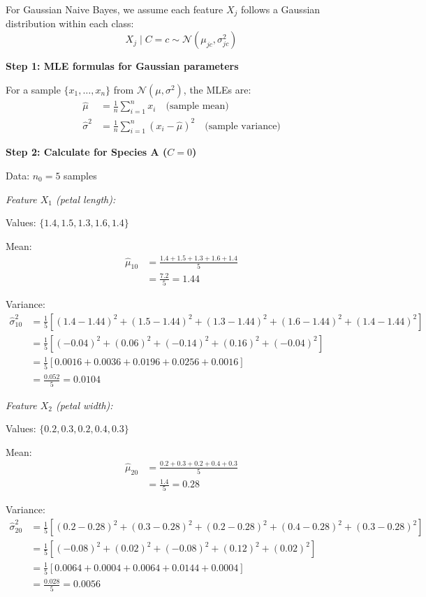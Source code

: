 \documentclass[12pt]{article}
\begin{document}
\begin{solution}
For Gaussian Naive Bayes, we assume each feature $X_j$ follows a Gaussian distribution within each class:
\[
X_j \mid C = c \sim \mathcal{N}(\mu_{jc}, \sigma_{jc}^2)
\]

\textbf{Step 1: MLE formulas for Gaussian parameters}

For a sample $\{x_1, \ldots, x_n\}$ from $\mathcal{N}(\mu, \sigma^2)$, the MLEs are:
\begin{align}
\hat{\mu} &= \frac{1}{n} \sum_{i=1}^{n} x_i \quad \text{(sample mean)} \\
\hat{\sigma}^2 &= \frac{1}{n} \sum_{i=1}^{n} (x_i - \hat{\mu})^2 \quad \text{(sample variance)}
\end{align}

\textbf{Step 2: Calculate for Species A ($C = 0$)}

Data: $n_0 = 5$ samples

\textit{Feature $X_1$ (petal length):}

Values: $\{1.4, 1.5, 1.3, 1.6, 1.4\}$

Mean:
\begin{align}
\hat{\mu}_{10} &= \frac{1.4 + 1.5 + 1.3 + 1.6 + 1.4}{5} \\
&= \frac{7.2}{5} = 1.44
\end{align}

Variance:
\begin{align}
\hat{\sigma}_{10}^2 &= \frac{1}{5}\left[(1.4-1.44)^2 + (1.5-1.44)^2 + (1.3-1.44)^2 + (1.6-1.44)^2 + (1.4-1.44)^2\right] \\
&= \frac{1}{5}\left[(-0.04)^2 + (0.06)^2 + (-0.14)^2 + (0.16)^2 + (-0.04)^2\right] \\
&= \frac{1}{5}\left[0.0016 + 0.0036 + 0.0196 + 0.0256 + 0.0016\right] \\
&= \frac{0.052}{5} = 0.0104
\end{align}

\textit{Feature $X_2$ (petal width):}

Values: $\{0.2, 0.3, 0.2, 0.4, 0.3\}$

Mean:
\begin{align}
\hat{\mu}_{20} &= \frac{0.2 + 0.3 + 0.2 + 0.4 + 0.3}{5} \\
&= \frac{1.4}{5} = 0.28
\end{align}

Variance:
\begin{align}
\hat{\sigma}_{20}^2 &= \frac{1}{5}\left[(0.2-0.28)^2 + (0.3-0.28)^2 + (0.2-0.28)^2 + (0.4-0.28)^2 + (0.3-0.28)^2\right] \\
&= \frac{1}{5}\left[(-0.08)^2 + (0.02)^2 + (-0.08)^2 + (0.12)^2 + (0.02)^2\right] \\
&= \frac{1}{5}\left[0.0064 + 0.0004 + 0.0064 + 0.0144 + 0.0004\right] \\
&= \frac{0.028}{5} = 0.0056
\end{align}


\end{solution}
\end{document}
